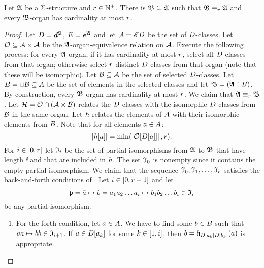 \begin{lemma}\label{lem:monadic-organ}
Let $\mathfrak{A}$ be a $\mathrm{\Sigma}$-structure and $r \in \mathbb{N}^{+}$.
There is $\mathfrak{B} \subseteq \mathfrak{A}$ such that $\mathfrak{B} \equiv_{r} \mathfrak{A}$ and every
$\mathfrak{B}$-organ has cardinality at most $r$.
\end{lemma}
\begin{proof}
Let $D = \bm{d}^{\mathfrak{A}}$, $E = \bm{e}^{\mathfrak{A}}$ and
let $\mathcal{A} = {\mathscr{E}D}$ be the set of $D$-classes.
Let $\mathcal{O} \subseteq {\mathcal{A}\times\mathcal{A}}$ be the $\mathfrak{A}$-organ-equivalence relation
on $\mathcal{A}$.
Execute the following process: for every $\mathfrak{A}$-organ, if it has cardinality at
most $r$, select all $D$-classes from that organ; otherwise select $r$
distinct $D$-classes from that organ (note that these will be isomorphic).
Let $\mathcal{B} \subseteq \mathcal{A}$ be the set of selected $D$-classes.
Let $B = \cup \mathcal{B} \subseteq A$ be the set of elements in the selected
classes and let $\mathfrak{B} = (\mathfrak{A} \restriction B)$.
By construction, every $\mathfrak{B}$-organ has cardinality at most $r$.
We claim that $\mathfrak{A} \equiv_{r} \mathfrak{B}$.
Let $\mathcal{H} = \mathcal{O} \cap (\mathcal{A}\times\mathcal{B})$ relates the $D$-classes with the
isomorphic $D$-classes from $\mathcal{B}$ in the same organ.
Let $h$ relates the elements of $A$ with their isomorphic elements from
$B$.
Note that for all elements $a \in A$:
\begin{equation}\label{eq:monadic-organ}
  \card{\selh[\ea]} = \min(\card{\Org[\relD[\ea]]}, \nr).
\end{equation}
For $i\in[0,r]$ let $\mathfrak{I}_{i}$ be the set of partial isomorphisms from
$\mathfrak{A}$ to $\mathfrak{B}$ that have length $\ii$ and that are included in $h$.
The set $\mathfrak{I}_{0}$ is nonempty since it contains the empty partial isomorphism.
We claim that the sequence $\mathfrak{I}_{0},\mathfrak{I}_{1},\dots,\mathfrak{I}_{r}$ satisfies the
back-and-forth conditions of .
Let $i \in [0,r-1]$ and let 
\[
  \mathfrak{p} = \bar{a} \mapsto \bar{b} =
  a_{1}a_{2}\dots a_{i} \mapsto b_{1}b_{2}\dots b_{i} \in \mathfrak{I}_{i}
\]
be any partial isomorphism.
\begin{enumerate}
  \item For the forth condition, let $a \in A$.
  We have to find some $b \in B$ such that
  $\bar{a}a \mapsto \bar{b}b \in \mathfrak{I}_{i+1}$.
  If $a \in D[a_{k}]$ for some $k \in [1,i]$,
  then $b = \mathfrak{h}_{D[a_{k}]D[b_{k}]}(a)$ is appropriate.
  

\end{enumerate}
\end{proof}
